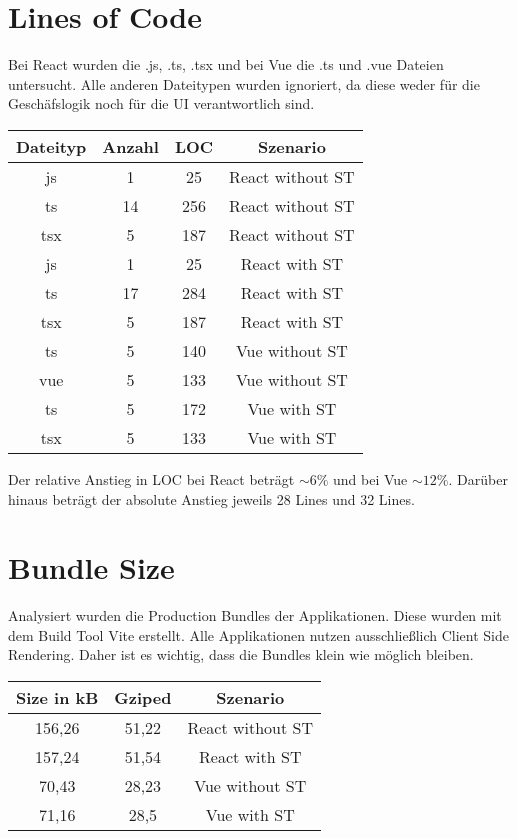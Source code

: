 \section{Lines of Code}

Bei React wurden die .js, .ts, .tsx und bei Vue die .ts und .vue Dateien untersucht. Alle anderen Dateitypen wurden ignoriert, da diese weder für die Geschäfslogik noch für die UI verantwortlich sind.

\begin{center}
  \begin{tabular}{|c|c|c|c|} 
   \hline
   Dateityp & Anzahl & LOC & Szenario \\ [0.5ex] 
   \hline\hline
   js & 1 & 25 & React without ST \\ 
   \hline
   ts & 14 & 256 & React without ST \\
   \hline
   tsx & 5 & 187 & React without ST \\
   \hline\hline
   js & 1 & 25 & React with ST \\ 
   \hline
   ts & 17 & 284 & React with ST \\
   \hline
   tsx & 5 & 187 & React with ST \\
   \hline\hline
   ts & 5 & 140 & Vue without ST \\
   \hline
   vue & 5 & 133 & Vue without ST \\
   \hline\hline
   ts & 5 & 172 & Vue with ST \\
   \hline
   tsx & 5 & 133 & Vue with ST \\
   \hline
  \end{tabular}
\end{center}

Der relative Anstieg in LOC bei React beträgt $\sim6\%$ und bei Vue $\sim12\%$. Darüber hinaus beträgt der absolute Anstieg jeweils 28 Lines und 32 Lines.

\section{Bundle Size}

Analysiert wurden die Production Bundles der Applikationen. Diese wurden mit dem Build Tool Vite erstellt. Alle Applikationen nutzen ausschließlich Client Side Rendering. Daher ist es wichtig, dass die Bundles klein wie möglich bleiben.

\begin{center}
  \begin{tabular}{|c|c|c|} 
   \hline
   Size in kB & Gziped & Szenario \\ [0.5ex]
   \hline\hline
   156,26 & 51,22 & React without ST \\
   \hline
   157,24 & 51,54 & React with ST \\
   \hline
   70,43 & 28,23 & Vue without ST \\
   \hline
   71,16 & 28,5 & Vue with ST \\
   \hline
  \end{tabular}
\end{center}

